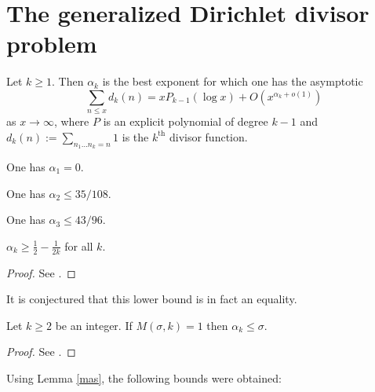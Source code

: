 \chapter{The generalized Dirichlet divisor problem}

\begin{definition}\label{divisor-def} Let $k \geq 1$. Then $\alpha_k$ is the best exponent for which one has the asymptotic
$$ \sum_{n \leq x} d_k(n) = x P_{k-1}(\log x) + O(x^{\alpha_k+o(1)})$$
as $x \to \infty$, where $P$ is an explicit polynomial of degree $k-1$ and $d_k(n) := \sum_{n_1 \dots n_k=n} 1$ is the $k^{\mathrm{th}}$ divisor function.
\end{definition}

\begin{lemma}[$d_1$ exponent]\label{divisor-1} One has $\alpha_1=0$.
\end{lemma}

\begin{lemma}\label{divisor-2-bound}\cite[Theorem 13.1]{ivic} One has $\alpha_2 \leq 35/108$.
\end{lemma}

\begin{lemma}\label{divisor-kolesnik}\cite{kolesnik} One has $\alpha_3 \leq 43/96$.
\end{lemma}


\begin{lemma}\label{divisor-lower} $\alpha_k \geq \frac{1}{2} - \frac{1}{2k}$ for all $k$.
\end{lemma}

\begin{proof} See \cite{hardy_divisor_1916, szego-walfisz-I, szego-walfisz-II}.
\end{proof}

It is conjectured that this lower bound is in fact an equality.

\begin{lemma}\label{mas}  Let $k \geq 2$ be an integer. If $M(\sigma,k) = 1$ then $\alpha_k \leq \sigma$.
\end{lemma}

\begin{proof}  See \cite[\S 13.3]{ivic}.
\end{proof}

Using Lemma \ref{mas}, the following bounds were obtained:

